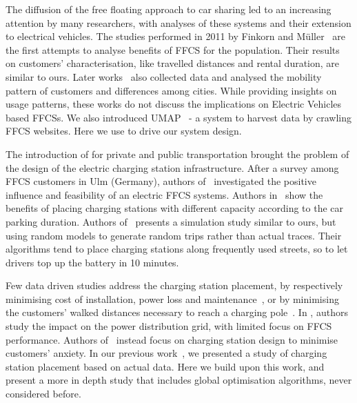 \documentclass[review, letterpaper,3p, 11pt]{elsarticle}
\providecommand{\DIFaddtex}[1]{{\protect\color{blue}\uwave{#1}}} %
\providecommand{\DIFaddbegin}{} %
\providecommand{\DIFaddend}{} %
\providecommand{\DIFdelbegin}{} %
\providecommand{\DIFdelend}{} %
\providecommand{\DIFadd}[1]{\texorpdfstring{\DIFaddtex{#1}}{#1}} %
\providecommand{\DIFdel}[1]{} %
\begin{document}
The diffusion of the free floating approach to car sharing led to an increasing attention by many researchers, with \DIFaddbegin \DIFadd{many }\DIFaddend analyses of
these systems and their extension to electrical vehicles. 
The studies performed in 2011 by Finkorn and M\"{u}ller~\cite{Firnkorn2011,FM12} are the first attempts to analyse benefits of FFCS for the population. Their results on customers' characterisation, like travelled distances and rental duration, are similar to ours.
Later works~\cite{Car2GoGlobalAnalysis,Kortum2016,Schmoller2015} also collected data and analysed the mobility pattern of customers and differences among cities. While providing insights on usage patterns, these works do not discuss the implications on Electric Vehicles based FFCSs. We also introduced UMAP~\cite{UMAP} - a system to harvest data by crawling FFCS websites. Here we use \DIFdelbegin \DIFdel{this data }\DIFdelend \DIFaddbegin \DIFadd{traces collected with UMAP }\DIFaddend to drive our system design.

The introduction of \DIFdelbegin \DIFdel{electric vehicles }\DIFdelend \DIFaddbegin \DIFadd{EVs }\DIFaddend for private and public transportation brought the problem of the design of the electric charging station infrastructure.
After a survey among FFCS customers in Ulm (Germany), authors of~\cite{FM15}  investigated the positive influence and feasibility of an electric FFCS systems.
Authors in~\cite{ChargingStationForVehicularNetworks} show the benefits of placing charging stations with different capacity according to the car parking duration. 
Authors of~\cite{bi2017simulation} presents a simulation study similar to ours, but using random models to generate random trips rather than actual traces. Their algorithms tend to place charging stations along frequently used streets, so to let drivers \DIFdelbegin \DIFdel{to }\DIFdelend top up the battery in 10 minutes.
\DIFaddbegin 

\DIFaddend Few data driven studies address the charging station placement,  by respectively minimising  cost of installation, power loss and maintenance~\cite{taormina,PlacementAndPowergrid,mipCSPpechino}, or by minimising the customers' walked distances necessary to reach a charging pole~\cite{placementAustin}.  
In \cite{PlacementAndPowergrid}, authors study the impact on the power distribution grid, with limited focus on FFCS performance. Authors of~\cite{mipCSPpechino} instead focus on charging station design to minimise customers' anxiety. 
In our previous work~\cite{taormina}, we presented a study of charging station placement based on actual data. Here we build upon this work, and present a more in depth study that includes global optimisation algorithms, never considered before.
\end{document}
